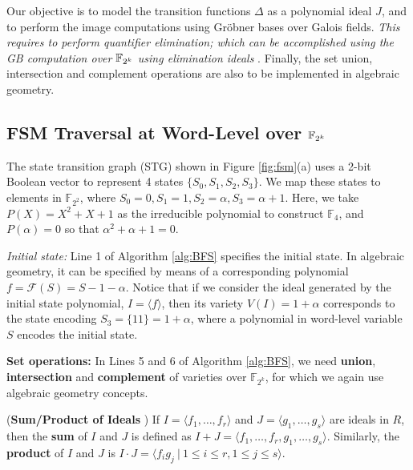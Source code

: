 Our objective is to model the transition functions $\Delta$ as a
polynomial ideal $J$, and to perform the image computations 
using Gr\"obner bases over Galois fields. {\it
This requires to perform quantifier elimination; which can be
accomplished using the GB computation over ${\mathbb{F}}_{2^k}$ using elimination
ideals} \cite{gao:qe-gf-gb}. Finally, the set union, intersection and
complement operations are also to be implemented in algebraic geometry.

\subsection{FSM Traversal at Word-Level over ${\mathbb{F}}_{2^k}$} 
The state transition graph (STG) shown in Figure \ref{fig:fsm}(a) uses a
2-bit Boolean vector to represent 4 states $\{S_0, S_1, S_2,
S_3\}$. We map these states to elements in $\mathbb{F}_{2^2}$, where
$S_0 = 0, S_1 = 1, S_2 = \alpha, S_3 = \alpha+1$. Here, we take 
$P(X) = X^2+X+1$ as the irreducible polynomial to construct
$\mathbb{F}_4$, and $P(\alpha) = 0$ so that $\alpha^2 + \alpha + 1 =
0$.  

{\it Initial state:} Line 1 of Algorithm \ref{alg:BFS} specifies the initial state.
In algebraic geometry, it can be specified by means of a corresponding polynomial
 $f = \mathcal{F}(S) =
S - 1 - \alpha$. Notice that if we consider the ideal generated by the
initial state polynomial, $I = \langle f\rangle$, then its variety
$V(I) = 1+\alpha$ corresponds to the state encoding $S_3 = \{11\} =
1+\alpha$, where a polynomial in word-level variable $S$ encodes the
initial state. 



{\bf Set operations:} In Lines 5 and 6 of
Algorithm  \ref{alg:BFS}, we need  \textbf{union}, 
\textbf{intersection} and \textbf{complement} of varieties over
$\mathbb{F}_{2^k}$, for which we again use algebraic geometry concepts.

\begin{Definition}
\label{def:sum}
({\bf Sum/Product of Ideals} \cite{ideals:book}) If $I = \langle f_1,
\dots, f_r\rangle$ and $J = \langle g_1, \dots, g_s\rangle$ are
ideals in $R$, then the {\bf sum} of $I$ and $J$ is defined as $I + J
= \langle f_1, \dots, f_r, g_1, \dots, g_s\rangle$. Similarly, the
{\bf product} of $I$ and $J$ is $I \cdot J = \langle
f_ig_j\ |\ 1 \leq i \leq r, 1 \leq j \leq s\rangle$. 
\end{Definition}

